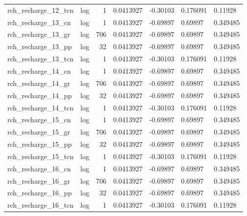 \documentclass{article}
\begin{document}
\begin{center}
\begin{landscape}
\begin{longtable}{llrllll}
rch\_recharge\_12\_tcn &       log &      1 &      0.0413927 &       -0.30103 &       0.176091 &            0.11928 \\
 rch\_recharge\_13\_cn &       log &      1 &      0.0413927 &       -0.69897 &        0.69897 &           0.349485 \\
 rch\_recharge\_13\_gr &       log &    706 &      0.0413927 &       -0.69897 &        0.69897 &           0.349485 \\
 rch\_recharge\_13\_pp &       log &     32 &      0.0413927 &       -0.69897 &        0.69897 &           0.349485 \\
rch\_recharge\_13\_tcn &       log &      1 &      0.0413927 &       -0.30103 &       0.176091 &            0.11928 \\
 rch\_recharge\_14\_cn &       log &      1 &      0.0413927 &       -0.69897 &        0.69897 &           0.349485 \\
 rch\_recharge\_14\_gr &       log &    706 &      0.0413927 &       -0.69897 &        0.69897 &           0.349485 \\
 rch\_recharge\_14\_pp &       log &     32 &      0.0413927 &       -0.69897 &        0.69897 &           0.349485 \\
rch\_recharge\_14\_tcn &       log &      1 &      0.0413927 &       -0.30103 &       0.176091 &            0.11928 \\
 rch\_recharge\_15\_cn &       log &      1 &      0.0413927 &       -0.69897 &        0.69897 &           0.349485 \\
 rch\_recharge\_15\_gr &       log &    706 &      0.0413927 &       -0.69897 &        0.69897 &           0.349485 \\
 rch\_recharge\_15\_pp &       log &     32 &      0.0413927 &       -0.69897 &        0.69897 &           0.349485 \\
rch\_recharge\_15\_tcn &       log &      1 &      0.0413927 &       -0.30103 &       0.176091 &            0.11928 \\
 rch\_recharge\_16\_cn &       log &      1 &      0.0413927 &       -0.69897 &        0.69897 &           0.349485 \\
 rch\_recharge\_16\_gr &       log &    706 &      0.0413927 &       -0.69897 &        0.69897 &           0.349485 \\
 rch\_recharge\_16\_pp &       log &     32 &      0.0413927 &       -0.69897 &        0.69897 &           0.349485 \\
rch\_recharge\_16\_tcn &       log &      1 &      0.0413927 &       -0.30103 &       0.176091 &            0.11928 \\

\end{longtable}
\end{landscape}
\end{center}
\end{document}
